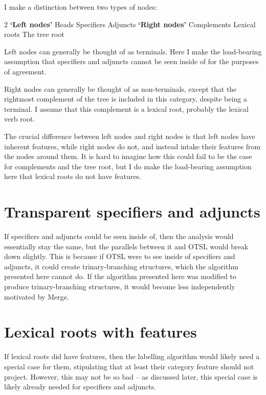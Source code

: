 
I make a distinction between two types of nodes:

\begin{multicols}{2}
\pex {} \textbf{`Left nodes'}
  \a Heads
  \a Specifiers
  \a Adjuncts
\xe
\columnbreak
\pex {} \textbf{`Right nodes'}
  \a Complements
  \a Lexical roots
  \a The tree root
\xe
\end{multicols}

Left nodes can generally be thought of as terminals. Here I make the load-bearing assumption that specifiers and adjuncts cannot be seen inside of for the purposes of agreement.

Right nodes can generally be thought of as non-terminals, except that the rightmost complement of the tree is included in this category, despite being a terminal. I assume that this complement is a lexical root, probably the lexical verb root.

The crucial difference between left nodes and right nodes is that left nodes have inherent features, while right nodes do not, and instead intake their features from the nodes around them. It is hard to imagine how this could fail to be the case for complements and the tree root, but I do make the load-bearing assumption here that lexical roots do not have features.

\section{Transparent specifiers and adjuncts}\label{sec:transparent-specifiers}

If specifiers and adjuncts could be seen inside of, then the analysis would essentially stay the same, but the parallels between it and OTSL would break down slightly. This is because if OTSL were to see inside of specifiers and adjuncts, it could create trinary-branching structures, which the algorithm presented here cannot do. If the algorithm presented here was modified to produce trinary-branching structures, it would become less independently motivated by Merge.

\section{Lexical roots with features}\label{sec:roots-with-features}

If lexical roots did have features, then the labelling algorithm would likely need a special case for them, stipulating that at least their category feature should not project. However, this may not be so bad -- as discussed later, this special case is likely already needed for specifiers and adjuncts.
